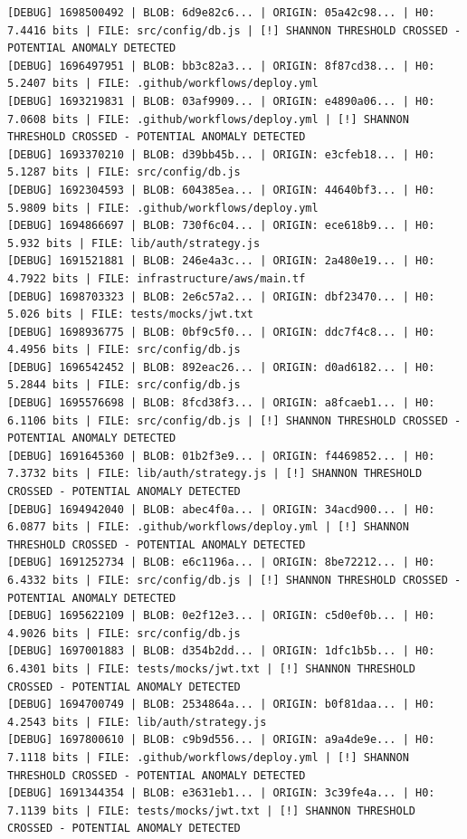\documentclass[12pt, a4paper, oneside]{report}
\begin{document}
\begin{lstlisting}[basicstyle=\tiny\ttfamily]
[DEBUG] 1698500492 | BLOB: 6d9e82c6... | ORIGIN: 05a42c98... | H0: 7.4416 bits | FILE: src/config/db.js | [!] SHANNON THRESHOLD CROSSED - POTENTIAL ANOMALY DETECTED
[DEBUG] 1696497951 | BLOB: bb3c82a3... | ORIGIN: 8f87cd38... | H0: 5.2407 bits | FILE: .github/workflows/deploy.yml
[DEBUG] 1693219831 | BLOB: 03af9909... | ORIGIN: e4890a06... | H0: 7.0608 bits | FILE: .github/workflows/deploy.yml | [!] SHANNON THRESHOLD CROSSED - POTENTIAL ANOMALY DETECTED
[DEBUG] 1693370210 | BLOB: d39bb45b... | ORIGIN: e3cfeb18... | H0: 5.1287 bits | FILE: src/config/db.js
[DEBUG] 1692304593 | BLOB: 604385ea... | ORIGIN: 44640bf3... | H0: 5.9809 bits | FILE: .github/workflows/deploy.yml
[DEBUG] 1694866697 | BLOB: 730f6c04... | ORIGIN: ece618b9... | H0: 5.932 bits | FILE: lib/auth/strategy.js
[DEBUG] 1691521881 | BLOB: 246e4a3c... | ORIGIN: 2a480e19... | H0: 4.7922 bits | FILE: infrastructure/aws/main.tf
[DEBUG] 1698703323 | BLOB: 2e6c57a2... | ORIGIN: dbf23470... | H0: 5.026 bits | FILE: tests/mocks/jwt.txt
[DEBUG] 1698936775 | BLOB: 0bf9c5f0... | ORIGIN: ddc7f4c8... | H0: 4.4956 bits | FILE: src/config/db.js
[DEBUG] 1696542452 | BLOB: 892eac26... | ORIGIN: d0ad6182... | H0: 5.2844 bits | FILE: src/config/db.js
[DEBUG] 1695576698 | BLOB: 8fcd38f3... | ORIGIN: a8fcaeb1... | H0: 6.1106 bits | FILE: src/config/db.js | [!] SHANNON THRESHOLD CROSSED - POTENTIAL ANOMALY DETECTED
[DEBUG] 1691645360 | BLOB: 01b2f3e9... | ORIGIN: f4469852... | H0: 7.3732 bits | FILE: lib/auth/strategy.js | [!] SHANNON THRESHOLD CROSSED - POTENTIAL ANOMALY DETECTED
[DEBUG] 1694942040 | BLOB: abec4f0a... | ORIGIN: 34acd900... | H0: 6.0877 bits | FILE: .github/workflows/deploy.yml | [!] SHANNON THRESHOLD CROSSED - POTENTIAL ANOMALY DETECTED
[DEBUG] 1691252734 | BLOB: e6c1196a... | ORIGIN: 8be72212... | H0: 6.4332 bits | FILE: src/config/db.js | [!] SHANNON THRESHOLD CROSSED - POTENTIAL ANOMALY DETECTED
[DEBUG] 1695622109 | BLOB: 0e2f12e3... | ORIGIN: c5d0ef0b... | H0: 4.9026 bits | FILE: src/config/db.js
[DEBUG] 1697001883 | BLOB: d354b2dd... | ORIGIN: 1dfc1b5b... | H0: 6.4301 bits | FILE: tests/mocks/jwt.txt | [!] SHANNON THRESHOLD CROSSED - POTENTIAL ANOMALY DETECTED
[DEBUG] 1694700749 | BLOB: 2534864a... | ORIGIN: b0f81daa... | H0: 4.2543 bits | FILE: lib/auth/strategy.js
[DEBUG] 1697800610 | BLOB: c9b9d556... | ORIGIN: a9a4de9e... | H0: 7.1118 bits | FILE: .github/workflows/deploy.yml | [!] SHANNON THRESHOLD CROSSED - POTENTIAL ANOMALY DETECTED
[DEBUG] 1691344354 | BLOB: e3631eb1... | ORIGIN: 3c39fe4a... | H0: 7.1139 bits | FILE: tests/mocks/jwt.txt | [!] SHANNON THRESHOLD CROSSED - POTENTIAL ANOMALY DETECTED

\end{lstlisting}
\end{document}

